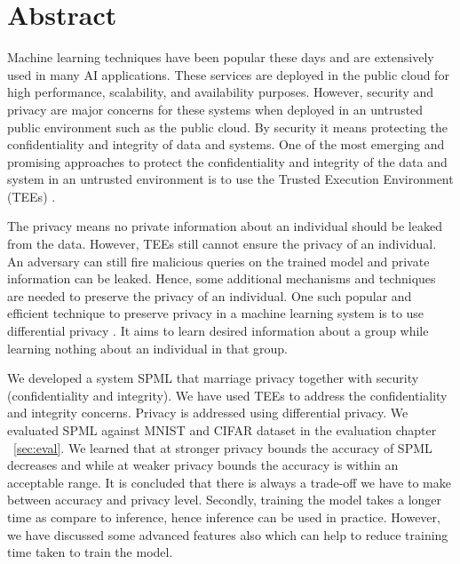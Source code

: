 

\section*{}\thispagestyle{empty}
\section*{Abstract}
Machine learning techniques have been popular these days and are extensively used in many AI applications. These services are deployed in the public cloud for high performance, scalability, and availability purposes. However, security and privacy are major concerns for these systems when deployed in an untrusted public environment such as the public cloud. By security it means protecting the confidentiality and integrity of data and systems. One of the most emerging and promising approaches to protect the confidentiality and integrity of the data and system in an untrusted environment is to use the Trusted Execution Environment (TEEs) \cite{59}. 

The privacy means no private information about an individual should be leaked from the data. However, TEEs still cannot ensure the privacy of an individual. An adversary can still fire malicious queries on the trained model and private information can be leaked. Hence, some additional mechanisms and techniques are needed to preserve the privacy of an individual. One such popular and efficient technique to preserve privacy in a machine learning system is to use differential privacy \cite{3}.  It aims to learn desired information about a group while learning nothing about an individual in that group. 

We developed a system SPML that marriage privacy together with security (confidentiality and integrity). We have used TEEs to address the confidentiality and integrity concerns. Privacy is addressed using differential privacy. We evaluated SPML against MNIST \cite{12} and CIFAR \cite{13} dataset in the evaluation chapter ~\ref{sec:eval}. We learned that at stronger privacy bounds the accuracy of SPML decreases and while at weaker privacy bounds the accuracy is within an acceptable range. It is concluded that there is always a trade-off we have to make between accuracy and privacy level. Secondly, training the model takes a longer time as compare to inference, hence inference can be used in practice. However, we have discussed some advanced features also which can help to reduce training time taken to train the model.

